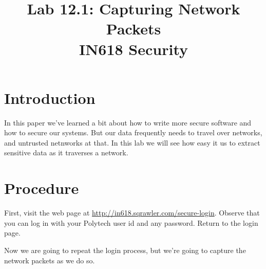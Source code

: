 \documentclass{article}
\begin{document}
\title{ Lab 12.1: Capturing Network Packets \\ IN618 Security}
\maketitle

\section*{Introduction}
In this paper we've learned a bit about how to write more secure software and how to secure our systems.  But our data frequently needs to travel over networks, and untrusted netnworks at that.  In this lab we will see how easy it us to extract sensitive data as it traverses a network.

\section{Procedure}
First, visit the web page at \url{http://in618.sqrawler.com/secure-login}.  Observe that you can log in with your Polytech user id and any password.  Return to the login page.

Now we are going to repeat the login process, but we're going to capture the network packets as we do so.
\end{document}
